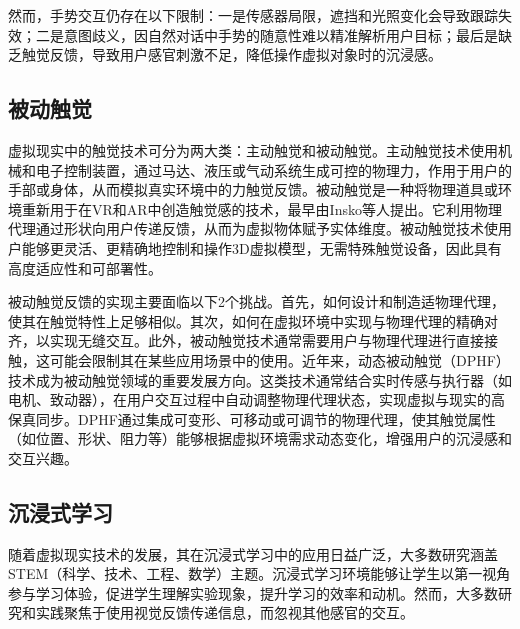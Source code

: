 \documentclass[runningheads]{llncs}
\begin{document}
然而，手势交互仍存在以下限制\cite{herbert2024static,app14114935}：一是传感器局限，遮挡和光照变化会导致跟踪失效；二是意图歧义，因自然对话中手势的随意性难以精准解析用户目标；最后是缺乏触觉反馈，导致用户感官刺激不足，降低操作虚拟对象时的沉浸感。

\subsection{被动触觉}
虚拟现实中的触觉技术可分为两大类：主动触觉和被动触觉。主动触觉技术使用机械和电子控制装置，通过马达、液压或气动系统生成可控的物理力，作用于用户的手部或身体，从而模拟真实环境中的力触觉反馈\cite{vaghela2021active}。被动触觉是一种将物理道具或环境重新用于在VR和AR中创造触觉感的技术，最早由Insko等人提出\cite{insko2001passive}。它利用物理代理通过形状向用户传递反馈，从而为虚拟物体赋予实体维度。被动触觉技术使用户能够更灵活、更精确地控制和操作3D虚拟模型，无需特殊触觉设备，因此具有高度适应性和可部署性\cite{henderson2008opportunistic,shapira2016tactilevr,10.1145/3313831.3376313}。

被动触觉反馈的实现主要面临以下2个挑战。首先，如何设计和制造适物理代理，使其在触觉特性上足够相似。其次，如何在虚拟环境中实现与物理代理的精确对齐，以实现无缝交互\cite{zenner2021combining}。此外，被动触觉技术通常需要用户与物理代理进行直接接触，这可能会限制其在某些应用场景中的使用。近年来，动态被动触觉（DPHF）技术成为被动触觉领域的重要发展方向。这类技术通常结合实时传感与执行器（如电机、致动器），在用户交互过程中自动调整物理代理状态，实现虚拟与现实的高保真同步。DPHF通过集成可变形、可移动或可调节的物理代理，使其触觉属性（如位置、形状、阻力等）能够根据虚拟环境需求动态变化，增强用户的沉浸感和交互兴趣\cite{zenner2017shifty}。


\subsection{沉浸式学习}
随着虚拟现实技术的发展，其在沉浸式学习中的应用日益广泛，大多数研究涵盖 STEM（科学、技术、工程、数学）主题\cite{georgiou2021learning,campos2022impact,prahani2022trend,informatics9040075,virtualworlds3040026}。沉浸式学习环境能够让学生以第一视角参与学习体验，促进学生理解实验现象，提升学习的效率和动机\cite{varela2017embodied}。然而，大多数研究和实践聚焦于使用视觉反馈传递信息，而忽视其他感官的交互。
\end{document}
